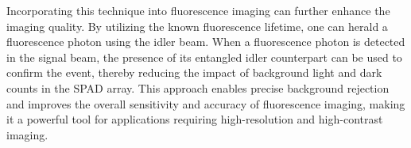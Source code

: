 Incorporating this technique into fluorescence imaging can further enhance the imaging quality. By utilizing the known fluorescence lifetime, one can herald a fluorescence photon using the idler beam. When a fluorescence photon is detected in the signal beam, the presence of its entangled idler counterpart can be used to confirm the event, thereby reducing the impact of background light and dark counts in the SPAD array. This approach enables precise background rejection and improves the overall sensitivity and accuracy of fluorescence imaging, making it a powerful tool for applications requiring high-resolution and high-contrast imaging. 


